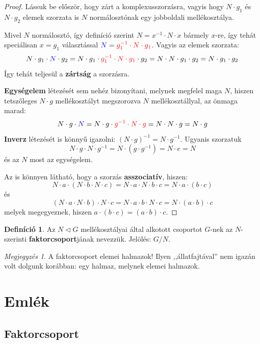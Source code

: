 \documentclass[12pt]{book}
\theoremstyle{plain} %
\theoremstyle{definition} %
\newtheorem{defi/}{Definíció}[section]
\newenvironment{defi}
  {\renewcommand{\qedsymbol}{$\clubsuit$}%
   \pushQED{\qed}\begin{defi/}}
  {\popQED\end{defi/}}
\theoremstyle{remark}
\newtheorem*{mj}{Megjegyzés}
\renewcommand\qedsymbol{$\blacksquare$}
\numberwithin{equation}{section}  %
\begin{document}
	\begin{proof}
		Lássuk be először, hogy zárt a komplexusszorzásra, vagyis hogy $N\cdot g_1$ és $N\cdot g_2$ elemek szorzata is $N$ normálosztónak egy jobboldali mellékosztálya.
		
		Mivel $N$ normálosztó, így definíció szerint $N=x^{-1}\cdot N \cdot x$ bármely $x$-re, így tehát speciálisan $x=g_1$ választással $\color{blue}N\color{black}=\color{red} g_1^{-1}\cdot N \cdot g_1 \color{black}$. Vagyis az elemek szorzata:
		\[ N\cdot g_1 \cdot \color{blue} N \color{black} \cdot g_2 = N\cdot g_1 \cdot  \color{red} g_1^{-1} \cdot N \cdot g_1 \color{black} \cdot g_2 = N \cdot N \cdot g_1 \cdot g_2 = N \cdot g_1 \cdot g_2 \]
		Így tehát teljesül a \textbf{zártság} a szorzásra.
		
		\textbf{Egységelem} létezését sem nehéz bizonyítani, melynek megfelel maga $N$, hiszen tetszőleges $N\cdot g$ mellékosztályt megszorozva $N$ mellékosztállyal, az önmaga marad:
		\[ N\cdot g \cdot \color{blue} N \color{black} = N\cdot g \cdot \color{red} g^{-1} \cdot N \cdot g \color{black} = N\cdot N \cdot g = N \cdot g \]
		\textbf{Inverz} létezését is könnyű igazolni: $(N\cdot g)^{-1} = N \cdot g^{-1} $. Ugyanis szorzatuk
		\[ N\cdot g \cdot N \cdot g^{-1} = N\cdot (g\cdot g^{-1}) = N \cdot e = N  \]
		és az $N$ most az egységelem.
		
		Az is könnyen látható, hogy a szorzás \textbf{asszociatív}, hiszen:
		\[ N\cdot a \cdot (N \cdot b \cdot N \cdot c) = N\cdot a \cdot N \cdot b \cdot c = N\cdot a\cdot (b\cdot c) \]
		és
		\[ (N \cdot a \cdot N \cdot b) \cdot N \cdot c = N\cdot a\cdot b \cdot N \cdot c = N \cdot (a\cdot b) \cdot c  \]
		melyek megegyeznek, hiszen $a\cdot (b\cdot c) = (a\cdot b) \cdot c$.
	\end{proof}

	\begin{defi}
		Az $N\triangleleft G$ mellékosztályai által alkotott csoportot $G$-nek az $N$-szerinti \textbf{faktorcsoport}jának nevezzük. Jelölés: $G/N$.
	\end{defi}

	\begin{mj}
		A faktorcsoport elemei halmazok! Ilyen ,,állatfajtával'' nem igazán volt dolgunk korábban: egy halmaz, melynek elemei halmazok.
	\end{mj}
	
	\chapter{Emlék}
	\section{Faktorcsoport}
	
\end{document}
